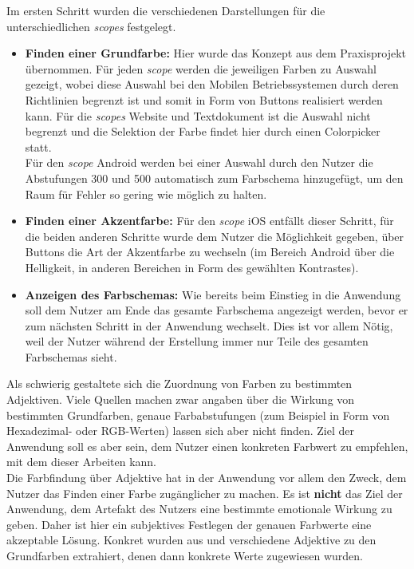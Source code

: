 Im ersten Schritt wurden die verschiedenen Darstellungen für die unterschiedlichen \textit{scopes} festgelegt.

\begin{itemize}
  \item \textbf{Finden einer Grundfarbe:} Hier wurde das Konzept aus dem Praxisprojekt übernommen. Für jeden \textit{scope} werden die jeweiligen Farben zu Auswahl gezeigt, wobei diese Auswahl bei den Mobilen Betriebssystemen durch deren Richtlinien begrenzt ist und somit in Form von Buttons realisiert werden kann.
Für die \textit{scopes} Website und Textdokument ist die Auswahl nicht begrenzt und die Selektion der Farbe findet hier durch einen Colorpicker statt.\\
Für den \textit{scope} Android werden bei einer Auswahl durch den Nutzer die Abstufungen 300 und 500 automatisch zum Farbschema hinzugefügt, um den Raum für Fehler so gering wie möglich zu halten.
  \item \textbf{Finden einer Akzentfarbe:} Für den \textit{scope} iOS entfällt dieser Schritt, für die beiden anderen Schritte wurde dem Nutzer die Möglichkeit gegeben, über Buttons die Art der Akzentfarbe zu wechseln (im Bereich Android über die Helligkeit, in anderen Bereichen in Form des gewählten Kontrastes).
  \item \textbf{Anzeigen des Farbschemas:} Wie bereits beim Einstieg in die Anwendung soll dem Nutzer am Ende das gesamte Farbschema angezeigt werden, bevor er zum nächsten Schritt in der Anwendung wechselt. Dies ist vor allem Nötig, weil der Nutzer während der Erstellung immer nur Teile des gesamten Farbschemas sieht.
\end{itemize}

Als schwierig gestaltete sich die Zuordnung von Farben zu bestimmten Adjektiven. Viele Quellen machen zwar angaben über die Wirkung von bestimmten Grundfarben, genaue Farbabstufungen (zum Beispiel in Form von Hexadezimal- oder RGB-Werten) lassen sich aber nicht finden. Ziel der Anwendung soll es aber sein, dem Nutzer einen konkreten Farbwert zu empfehlen, mit dem dieser Arbeiten kann. \\
Die Farbfindung über Adjektive hat in der Anwendung vor allem den Zweck, dem Nutzer das Finden einer Farbe zugänglicher zu machen. Es ist \textbf{nicht} das Ziel der Anwendung, dem Artefakt des Nutzers eine bestimmte emotionale Wirkung zu geben. Daher ist hier ein subjektives Festlegen der genauen Farbwerte eine akzeptable Lösung. Konkret wurden aus \cite{Wright2017Color} und \cite{Cooper200903} verschiedene Adjektive zu den Grundfarben extrahiert, denen dann konkrete Werte zugewiesen wurden.

